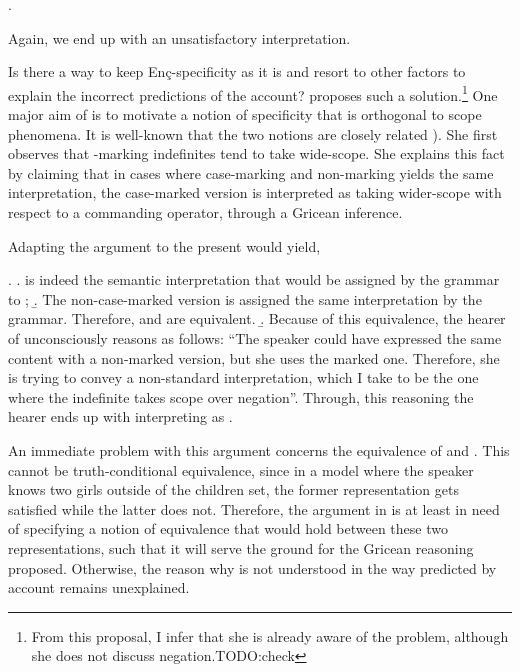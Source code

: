 \documentclass[11pt,a4paper]{article}
\newcommand{\encspec}{Enç-specific}
\begin{document}
\ex.\label{Exencwide}

Again, we end up with an unsatisfactory interpretation.

Is there a way to keep \encspec ity as it is and resort to other factors to
explain the incorrect predictions of the account?  proposes such a
solution.\footnote{From this proposal, I infer that she is already aware of the
problem, although she does not discuss negation.TODO:check} One major aim of
 is to motivate a notion of specificity that is orthogonal to scope
phenomena. It is well-known that the two notions are closely related
). She first observes that \acc-marking indefinites tend to
take wide-scope. She explains this fact by claiming that in cases where
case-marking and non-marking yields the same interpretation, the case-marked
version is interpreted as taking wider-scope with respect to a commanding
operator, through a Gricean inference.

Adapting the argument to the present would yield,

\ex.\label{encgrice}
\a.  is indeed the semantic interpretation that would be assigned by the grammar to ;
\b. The non-case-marked version is assigned the same interpretation by the grammar. Therefore,   and  are equivalent.
\b. Because of this equivalence, the hearer of  unconsciously reasons as follows: ``The speaker could have expressed the same content with a non-marked version, but she uses the marked one. Therefore, she is trying to convey a non-standard interpretation, which I take to be the one where the indefinite takes scope over negation''. Through, this reasoning the hearer ends up with interpreting  as .


An immediate problem with this argument concerns the equivalence of
 and . This cannot be
truth-conditional equivalence, since in a model where the speaker knows two
girls outside of the children set, the former representation gets satisfied
while the latter does not. Therefore, the argument in  is at
least in need of specifying a notion of equivalence that would hold between
these two representations, such that it will serve the ground for the Gricean
reasoning proposed. Otherwise, the reason why  is not
understood in the way predicted by  account remains unexplained.
\end{document}

